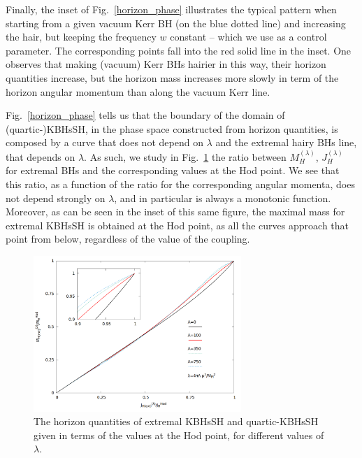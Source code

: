 Finally, the inset of Fig.~\ref{horizon_phase} illustrates the typical pattern when starting from a given vacuum Kerr BH (on the blue dotted line) and increasing the hair, but keeping the frequency $w$ constant -- which we use as a control parameter. The corresponding points fall into the red solid line in the inset. One observes that making (vacuum) Kerr BHs hairier in this way, their horizon quantities increase, but the horizon mass increases more slowly in term of the horizon angular momentum than along the vacuum Kerr line. 


Fig.~\ref{horizon_phase} tells us that the boundary of the domain of (quartic-)KBHsSH, in the phase space constructed from horizon quantities, is composed by a curve that does not depend on $\lambda$ and the extremal hairy BHs line, that depends on $\lambda$.  As such, we study in Fig.~\ref{horizon_ratios}
the ratio between $M_H^{(\lambda)}$, $J_H^{(\lambda)}$ for extremal BHs and the corresponding values at the Hod point. We see that this ratio, as a function of the ratio for the corresponding angular momenta, does not depend strongly on $\lambda$, and in particular is always a monotonic function. Moreover, as can be seen in the inset of this same figure, the maximal mass for extremal KBHsSH is obtained at the Hod point, as all the curves approach that point from below, regardless of the value of the coupling.

\begin{figure}[h!]
  \begin{center}
    \includegraphics[width=0.7\textwidth]{papers/selfInteractions/horizon-ratios.png}
      \end{center}
      \caption{ The horizon quantities of extremal  KBHsSH and quartic-KBHsSH given in terms of the values at the Hod point, for different values of $\lambda$.}
  \label{horizon_ratios}
\end{figure}


